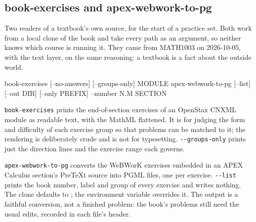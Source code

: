 \subsection*{book-exercises and apex-webwork-to-pg}

Two readers of a textbook's own source, for the start of a practice set.
Both work from a local clone of the book and take every path as an argument, so neither knows which course is running it.
They came from MATH1003 on 2026-10-05, with the text layer, on the same reasoning: a textbook is a fact about the outside world.

\begin{manexsource}
book-exercises [--no-answers] [--groups-only] MODULE
apex-webwork-to-pg [--list] [--out DIR] [--only PREFIX] --number N.M SECTION
\end{manexsource}

\texttt{book-exercises} prints the end-of-section exercises of an OpenStax CNXML module as readable text, with the MathML flattened.
It is for judging the form and difficulty of each exercise group so that problems can be matched to it; the rendering is deliberately crude and is not for typesetting.
\texttt{-{}-groups-only} prints just the direction lines and the exercise range each governs.

\texttt{apex-webwork-to-pg} converts the WeBWorK exercises embedded in an APEX Calculus section's PreTeXt source into PGML  files, one per exercise.
\texttt{-{}-list} prints the book number, label and group of every exercise and writes nothing.
The clone defaults to ; the environment variable  overrides it.
The output is a faithful conversion, not a finished problem: the book's problems still need the usual edits, recorded in each file's header.
